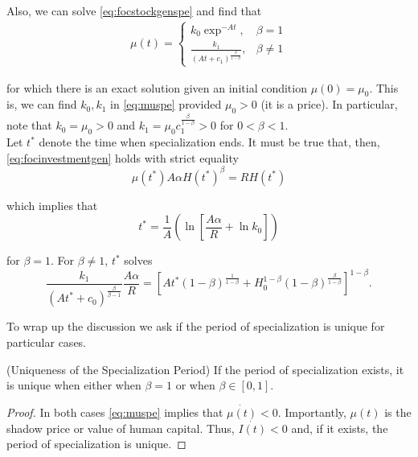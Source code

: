 \indent Also, we can solve \eqref{eq:focstockgenspe} and find that
\begin{eqnarray}
\mu(t) =
\begin{cases}
k_{0} \exp^{-At}, & \beta = 1 \\
\frac{k_{1}}{(At + c_{1})^{\frac{\beta}{1-\beta}}}, & \beta \neq 1 \label{eq:muspe}
\end{cases}
\end{eqnarray}

\noindent for which there is an exact solution given an initial condition $\mu(0) = \mu_{0}$. This is, we can find $k_{0}, k_{1}$ in \eqref{eq:muspe} provided $\mu_{0} > 0$ (it is a price). In particular, note that $k_{0} = \mu_{0} > 0$ and $k_{1} = \mu_{0} c_{1}^{\frac{\beta}{1-\beta}} > 0$ for $0<\beta<1$.\\
\indent Let $t^*$ denote the time when specialization ends. It must be true that, then, \eqref{eq:focinvestmentgen} holds with strict equality
\begin{equation}
\mu(t^*) A \alpha H(t^*)^{\beta} = RH(t^*)
\end{equation}

\noindent which implies that 
\begin{equation}
t^* = \frac{1}{A} \left( \ln \left[ \frac{A\alpha}{R} + \ln k_{0} \right] \right)
\end{equation}

\noindent for $\beta = 1$. For $\beta \neq 1$, $t^*$ solves
\begin{equation}
\frac{k_{1}}{ \left( At^* + c_{0} \right)^{\frac{\beta}{\beta-1}}} \frac{A \alpha}{R} = \left[ At^* \left( 1 - \beta \right)^{\frac{1}{1 - \beta}} + H_{0}^{1 - \beta} \left( 1 - \beta \right)^{\frac{\beta}{1 - \beta}} \right]^{1 - \beta}.
\end{equation}

\indent To wrap up the discussion we ask if the period of specialization is unique for particular cases.

\begin{claim} (Uniqueness of the Specialization Period)
If the period of specialization exists, it is unique when either when $\beta = 1$ or when $\beta \in [0,1]$. 
\end{claim}

\begin{proof}
In both cases \eqref{eq:muspe} implies that $\dot{\mu(t)} < 0$. Importantly, $\mu(t)$ is the shadow price or value of human capital. Thus, $\dot{I(t)} < 0 $ and, if it exists, the period of specialization is unique.
\end{proof}


